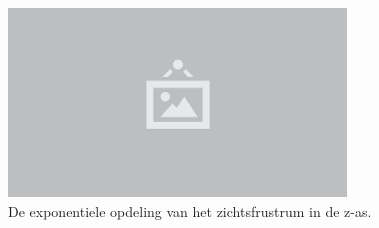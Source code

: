 \begin{figure}
  \centering
  \includegraphics[width=0.8\textwidth]{./img/raw/placeholder.png}
  \caption{De exponentiele opdeling van het zichtsfrustrum in de z-as.}
  \label{fig:cs-opdeling}
\end{figure}
